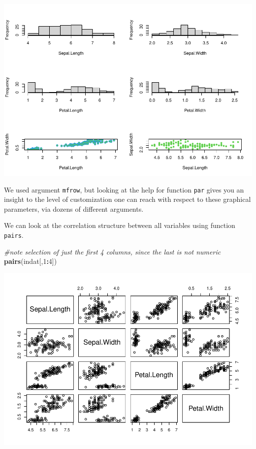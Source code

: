 \documentclass[
]{article}
\newenvironment{Shaded}{\begin{snugshade}}{\end{snugshade}}
\newcommand{\CommentTok}[1]{\textcolor[rgb]{0.56,0.35,0.01}{\textit{#1}}}
\newcommand{\DecValTok}[1]{\textcolor[rgb]{0.00,0.00,0.81}{#1}}
\newcommand{\FunctionTok}[1]{\textcolor[rgb]{0.13,0.29,0.53}{\textbf{#1}}}
\newcommand{\NormalTok}[1]{#1}
\newcommand{\SpecialCharTok}[1]{\textcolor[rgb]{0.81,0.36,0.00}{\textbf{#1}}}
\begin{document}
\includegraphics{TAMsIntro2RviaRStudioTutorial_files/figure-latex/unnamed-chunk-51-1.pdf}

We used argument \texttt{mfrow}, but looking at the help for function
\texttt{par} gives you an insight to the level of customization one can
reach with respect to these graphical parameters, via dozens of
different arguments.

We can look at the correlation structure between all variables using
function \texttt{pairs}.

\begin{Shaded}
\begin{Highlighting}[]
\CommentTok{\#note selection of just the first 4 columns, since the last is not numeric}
\FunctionTok{pairs}\NormalTok{(indat[,}\DecValTok{1}\SpecialCharTok{:}\DecValTok{4}\NormalTok{])}
\end{Highlighting}
\end{Shaded}

\includegraphics{TAMsIntro2RviaRStudioTutorial_files/figure-latex/unnamed-chunk-52-1.pdf}
\end{document}

